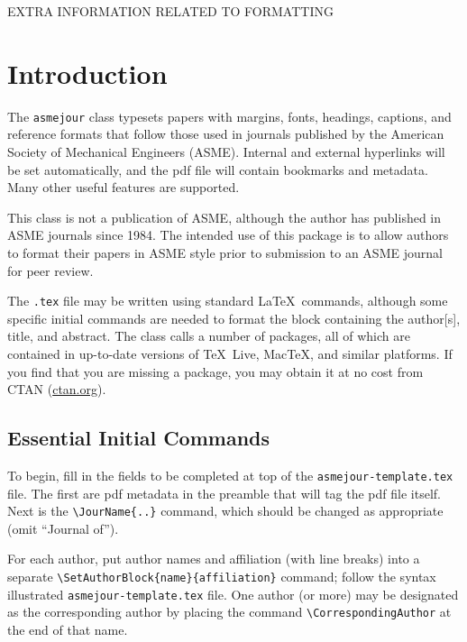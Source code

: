 \documentclass[subscriptcorrection,upint,varvw,mathalfa=cal=euler,barcolor=black,balance,hyphenate,french,pdf-a,nolists]{asmejour}
\begin{document}
\nocite{*} %




\vspace{2cm}
EXTRA INFORMATION RELATED TO FORMATTING

\section{Introduction}

The \texttt{asmejour} class typesets papers with margins, fonts, headings, captions, and reference formats that follow those used in journals published by the American Society of Mechanical Engineers (ASME). Internal and external hyperlinks will be set automatically, and the pdf file will contain bookmarks and metadata. Many other useful features are supported.

This class is not a publication of ASME, although the author has published in ASME journals since 1984. The intended use of this package is to allow authors to format their papers in ASME style prior to submission to an ASME journal for peer review.

The \texttt{.tex} file may be written using standard \LaTeX\ commands, although some specific initial commands are needed to format the block containing the author[s], title, and abstract. The class calls a number of packages, all of which are contained in up-to-date versions of \TeX~Live, Mac\TeX, and similar platforms. If you find that you are missing a package, you may obtain it at no cost from CTAN (\href{http://ctan.org}{ctan.org}).

\subsection{Essential Initial Commands}
To begin, fill in the fields to be completed at top of the \texttt{asmejour-template.tex} file. The first are pdf metadata in the preamble that will tag the pdf file itself. Next is the \verb|\JourName{..}| command, which should be changed as appropriate (omit ``Journal of'').

For each author, put author names and affiliation (with line breaks) into a separate \verb|\SetAuthorBlock{name}{affiliation}| command; follow the syntax illustrated \texttt{asmejour-template.tex} file.  One author (or more) may be designated as the corresponding author  by placing the command \verb|\CorrespondingAuthor| at the end of that name.
\end{document}
